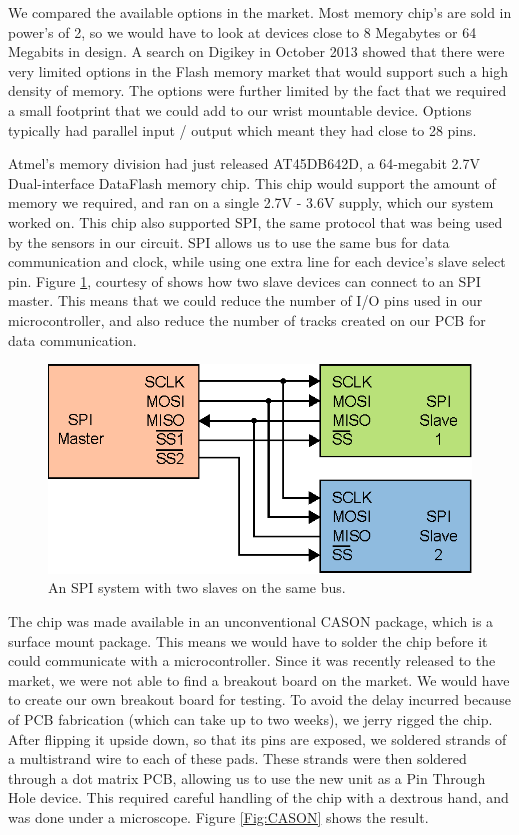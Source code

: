 We compared the available options in the market. Most memory chip's are sold in power's of 2, so we would have to look at devices close to 8 Megabytes or 64 Megabits in design. A search on Digikey in October 2013 showed that there were very limited options in the Flash memory market that would support such a high density of memory. The options were further limited by the fact that we required a small footprint that we could add to our wrist mountable device. Options typically had parallel input / output which meant they had close to 28 pins.

Atmel's memory division had just released AT45DB642D, a 64-megabit 2.7V Dual-interface DataFlash memory chip. This chip would support the amount of memory we required, and ran on a single 2.7V - 3.6V supply, which our system worked on. This chip also supported SPI, the same protocol that was being used by the sensors in our circuit. SPI allows us to use the same bus for data communication and clock, while using one extra line for each device's slave select pin. Figure \ref{Fig:SPISLAVES}, courtesy of \cite{Web:WikiCBurnett} shows how two slave devices can connect to an SPI master. This means that we could reduce the number of I/O pins used in our microcontroller, and also reduce the number of tracks created on our PCB for data communication.

\begin{figure}
\begin{center}
\includegraphics{images/SPI_SLAVES.eps}
\caption{An SPI system with two slaves on the same bus.}
\label{Fig:SPISLAVES}
\end{center}
\end{figure}

The chip was made available in an unconventional CASON package,
which is a surface mount package.
This means we would have to solder the chip before it could communicate with a microcontroller.
Since it was recently released to the market,
we were not able to find a breakout board on the market.
We would have to create our own breakout board for testing.
To avoid the delay incurred because of PCB fabrication (which can take up to two weeks), we jerry rigged the chip. After flipping it upside down, so that its pins are exposed, we soldered strands of a multistrand wire to each of these pads. These strands were then soldered through a dot matrix PCB, allowing us to use the new unit as a Pin Through Hole device. This required careful handling of the chip with a dextrous hand, and was done under a microscope. Figure \ref{Fig:CASON} shows the result. 

